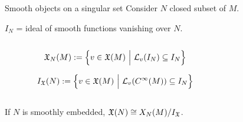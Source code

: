 \documentclass[handout,10pt]{beamer}
\begin{document}
    
      \begin{frame}[shrink]{Smooth objects on a singular set}
        Consider $N$ closed subset of $M$.
        \vfill
        \pause
        \begin{defblock}
          $I_N$ = ideal of smooth functions vanishing over $N$.
        \end{defblock}
    \vfill
    \pause
    
        \begin{columns}[T]
          \setlength{\belowdisplayskip}{5pt}
          \begin{column}{.65\linewidth}
            \centering \it
            \begin{defblock}[v.f tangent to $N$]
              \begin{displaymath}
                \mathfrak{X}_N(M):=
                \left\lbrace
                v \in \mathfrak{X}(M)
                ~\Big\vert~
                \mathcal{L}_v(I_N) \subseteq I_N
                \right\rbrace
              \end{displaymath}
            \end{defblock}
            \begin{defblock}[v.f vanishing on $N$]
              \begin{displaymath}
                I_{\mathfrak{X}}(N):=
                \left\lbrace
                v \in \mathfrak{X}(M)
                ~\Big\vert~
                \mathcal{L}_v(C^\infty(M)) \subseteq I_N
                \right\rbrace
              \end{displaymath}
            \end{defblock}
          \end{column}
          \begin{column}{.35\linewidth}
            \centering
            
          \end{column}
        \end{columns}
    \pause
    
    
        \begin{tcolorbox}[
          enhanced,frame hidden,borderline={0.5pt}{0pt}{blue},
          arc=5pt,colback=white,
          colbacktitle=white,]
           If $N$ is smoothly embedded,  $\mathfrak{X}(N)\cong {X_N(M)}/{I_{\mathfrak{X}}}$.
        \end{tcolorbox}
    

\end{frame}
\end{document}
